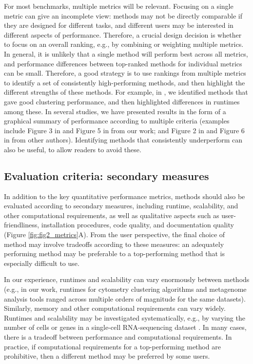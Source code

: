 For most benchmarks, multiple metrics will be relevant. Focusing on a single metric can give an incomplete view: methods may not be directly comparable if they are designed for different tasks, and different users may be interested in different aspects of performance. Therefore, a crucial design decision is whether to focus on an overall ranking, e.g., by combining or weighting multiple metrics. In general, it is unlikely that a single method will perform best across all metrics, and performance differences between top-ranked methods for individual metrics can be small. Therefore, a good strategy is to use rankings from multiple metrics to identify a set of consistently high-performing methods, and then highlight the different strengths of these methods. For example, in \cite{weber_comparisonclusteringmethods_2016}, we identified methods that gave good clustering performance, and then highlighted differences in runtimes among these. In several studies, we have presented results in the form of a graphical summary of performance according to multiple criteria (examples include Figure 3 in \cite{saelens_comparisonsinglecelltrajectory_2019} and Figure 5 in \cite{soneson_biasrobustnessscalability_2018} from our work; and Figure 2 in \cite{sage_quantitativeevaluationsoftware_2015} and Figure 6 in \cite{korthauer_practicalguidemethods_2019} from other authors). Identifying methods that consistently underperform can also be useful, to allow readers to avoid these.

\subsection{Evaluation criteria: secondary measures}

In addition to the key quantitative performance metrics, methods should also be evaluated according to secondary measures, including runtime, scalability, and other computational requirements, as well as qualitative aspects such as user-friendliness, installation procedures, code quality, and documentation quality (Figure \ref{fig:fig2_metrics}A). From the user perspective, the final choice of method may involve tradeoffs according to these measures: an adequately performing method may be preferable to a top-performing method that is especially difficult to use.

In our experience, runtimes and scalability can vary enormously between methods (e.g., in our work, runtimes for cytometry clustering algorithms \cite{weber_comparisonclusteringmethods_2016} and metagenome analysis tools \cite{lindgreen_evaluationaccuracyspeed_2016} ranged across multiple orders of magnitude for the same datasets). Similarly, memory and other computational requirements can vary widely. Runtimes and scalability may be investigated systematically, e.g., by varying the number of cells or genes in a single-cell RNA-sequencing dataset \cite{duo_systematicperformanceevaluation_2018,soneson_biasrobustnessscalability_2018}. In many cases, there is a tradeoff between performance and computational requirements. In practice, if computational requirements for a top-performing method are prohibitive, then a different method may be preferred by some users.

